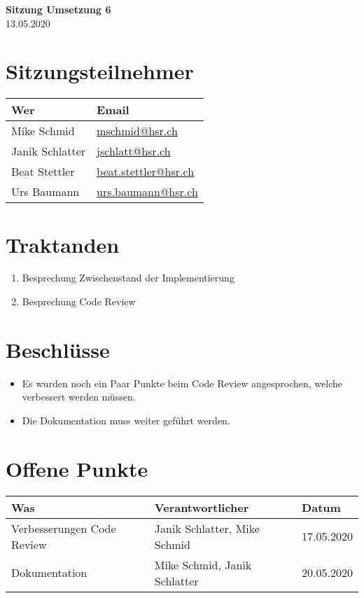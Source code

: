 \documentclass[
	ngerman,
	toc=listof, %
	toc=bibliography, %
	footnotes=multiple, %
	parskip=half, %
	numbers=noendperiod %
]{scrartcl}
\newcommand{\titel}{Sitzung Umsetzung 6}
\newcommand{\datum}{13.05.2020}
\begin{document}
\begin{center}
    \LARGE \textbf{\titel} \\[2ex]
    \large \datum \\[2ex]
\end{center}

\section*{Sitzungsteilnehmer}
\begin{tabularx}{0.9\linewidth}{Xl}
	\toprule
	Wer & Email \\
	\midrule
	Mike Schmid & \scriptsize \url{mschmid@hsr.ch} \\
	Janik Schlatter & \scriptsize \url{jschlatt@hsr.ch} \\
	Beat Stettler & \scriptsize \url{beat.stettler@hsr.ch} \\
	Urs Baumann & \scriptsize \url{urs.baumann@hsr.ch} \\
	\bottomrule
\end{tabularx}

\section*{Traktanden}
\begin{enumerate}
	\item Besprechung Zwischenstand der Implementierung
	\item Besprechung Code Review
\end{enumerate}

\section*{Beschlüsse}
	\begin{itemize}
		\item Es wurden noch ein Paar Punkte beim Code Review angesprochen, welche verbessert werden müssen.
		\item Die Dokumentation muss weiter geführt werden.
	\end{itemize}

\section*{Offene Punkte}
\begin{tabularx}{0.9\linewidth}{Xll}
	\toprule
	Was & Verantwortlicher & Datum \\
	\midrule
	 Verbesserungen Code Review & Janik Schlatter, Mike Schmid & 17.05.2020 \\
	 Dokumentation & Mike Schmid, Janik Schlatter & 20.05.2020 \\
	\bottomrule
\end{tabularx}
\end{document}
